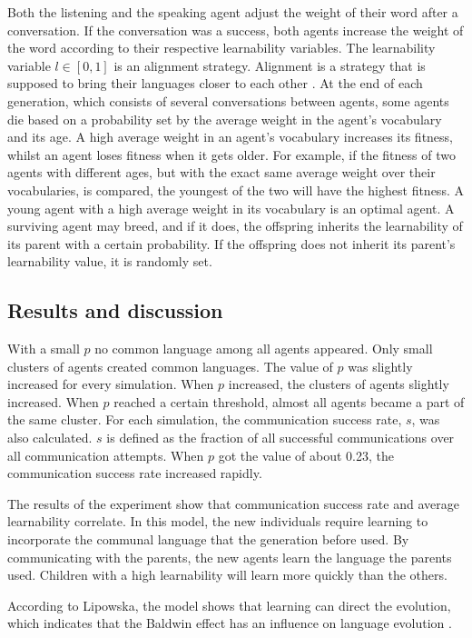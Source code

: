 Both the listening and the speaking agent adjust the weight of their word after a conversation. If the conversation was a success, both agents increase the weight of the word according to their respective learnability variables. The learnability variable $ l \in [0, 1]$ is an alignment strategy. Alignment is a strategy that is supposed to bring their languages closer to each other \citep{steels2012experiments}. At the end of each generation, which consists of several conversations between agents, some agents die based on a probability set by the average weight in the agent's vocabulary and its age. A high average weight in an agent's vocabulary increases its fitness, whilst an agent loses fitness when it gets older. For example, if the fitness of two agents with different ages, but with the exact same average weight over their vocabularies, is compared, the youngest of the two will have the highest fitness. A young agent with a high average weight in its vocabulary is an optimal agent. A surviving agent may breed, and if it does, the offspring inherits the learnability of its parent with a certain probability. If the offspring does not inherit its parent's learnability value, it is randomly set.

\subsection{Results and discussion}
With a small $p$ no common language among all agents appeared. Only small clusters of agents created common languages. The value of $p$ was slightly increased for every simulation. When $p$ increased, the clusters of agents slightly increased. When $p$ reached a certain threshold, almost all agents became a part of the same cluster. For each simulation, the communication success rate, $s$, was also calculated. $s$ is defined as the fraction of all successful communications over all communication attempts. When $p$ got the value of about 0.23, the communication success rate increased rapidly. 

The results of the experiment show that communication success rate and average learnability correlate. In this model, the new individuals require learning to incorporate the communal language that the generation before used. By communicating with the parents, the new agents learn the language the parents used. Children with a high learnability will learn more quickly than the others. 

According to Lipowska, the model shows that learning can direct the evolution, which indicates that the Baldwin effect has an influence on language evolution \citep[Section 4]{lipowska2011naming}.

